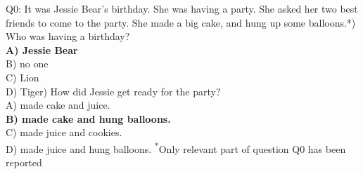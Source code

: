 \begin{framed}
\begin{flushleft}
{\small Q0}: It was Jessie Bear's birthday. She was having a party.  She asked her two best friends to
come to the party.  She made a big cake, and hung up some balloons.*\newline{}) Who was having a birthday?\\
\textbf{A) Jessie Bear}\\
B) no one\\
C) Lion\\
D) Tiger\newline{}) How did Jessie get ready for the party?\\
A) made cake and juice.\\
\textbf{B) made cake and hung balloons.}\\
C) made juice and cookies.\\
D) made juice and hung balloons.\newline\newline
{\small  \textsuperscript{*}Only relevant part of question {\small Q0} has been reported} 
\end{flushleft}
\end{framed}